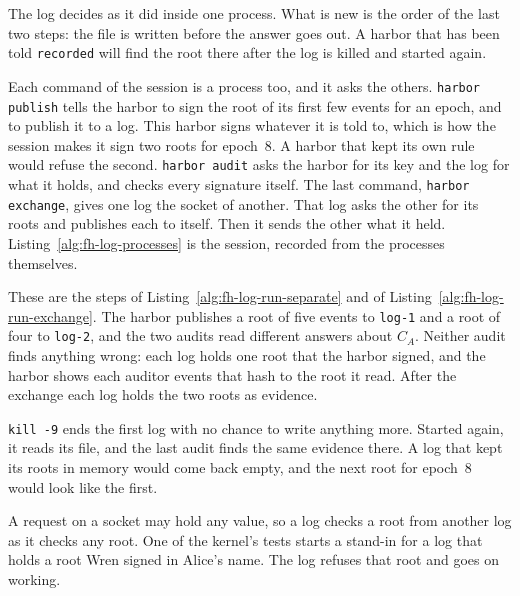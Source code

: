 
The log decides as it did inside one process. What is new is the order of
the last two steps: the file is written before the answer goes out. A
harbor that has been told \texttt{recorded} will find the root there
after the log is killed and started again.

Each command of the session is a process too, and it asks the others.
\texttt{harbor publish} tells the harbor to sign the root of its first
few events for an epoch, and to publish it to a log. This harbor signs
whatever it is told to, which is how the session makes it sign two roots
for epoch~8. A harbor that kept its own rule would refuse the second.
\texttt{harbor audit} asks the harbor for its key and the log for what it
holds, and checks every signature itself. The last command,
\texttt{harbor exchange}, gives one log the socket of another. That log
asks the other for its roots and publishes each to itself. Then it sends
the other what it held. Listing~\ref{alg:fh-log-processes} is the
session, recorded from the processes themselves.


These are the steps of Listing~\ref{alg:fh-log-run-separate} and of
Listing~\ref{alg:fh-log-run-exchange}. The harbor publishes a root of
five events to \texttt{log-1} and a root of four to \texttt{log-2}, and
the two audits read different answers about $C_A$. Neither audit finds
anything wrong: each log holds one root that the harbor signed, and the
harbor shows each auditor events that hash to the root it read. After the
exchange each log holds the two roots as evidence.

\texttt{kill -9} ends the first log with no chance to write anything
more. Started again, it reads its file, and the last audit finds the same
evidence there. A log that kept its roots in memory would come back
empty, and the next root for epoch~8 would look like the first.

A request on a socket may hold any value, so a log checks a root from
another log as it checks any root. One of the kernel's tests starts a
stand-in for a log that holds a root Wren signed in Alice's name. The log
refuses that root and goes on working.



